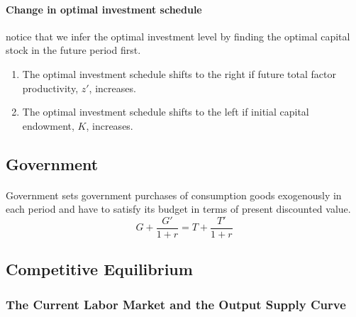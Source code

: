 \documentclass[11pt]{article}
\begin{document}
					\paragraph{Change in optimal investment schedule} notice that we infer the optimal investment level by finding the optimal capital stock in the future period first.
					\begin{enumerate}
						\item The optimal investment schedule shifts to the right if future total factor productivity, $z'$, increases.
						\item The optimal investment schedule shifts to the left if initial capital endowment, $K$, increases.
					\end{enumerate}
			\subsection{Government}
				\paragraph{}Government sets government purchases of consumption goods exogenously in each period and have to satisfy its budget in terms of present discounted value.
				\begin{equation}
					G + \frac{G'}{1+r} = T + \frac{T'}{1+r}
				\end{equation}
				
			\subsection{Competitive Equilibrium}
				\subsubsection{The Current Labor Market and the Output Supply Curve}
\end{document}

